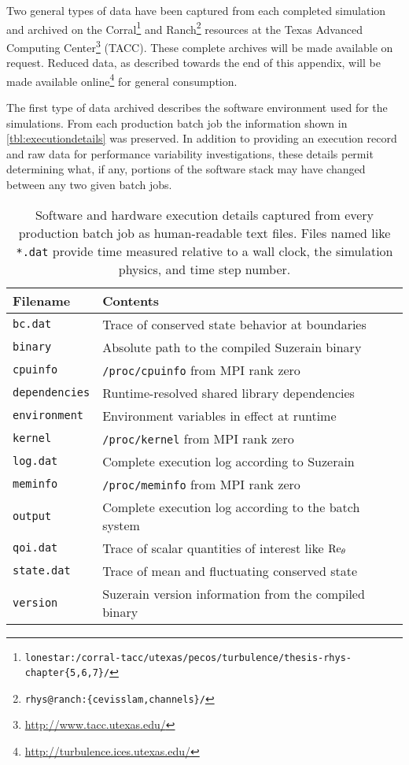 \label{sec:archiving}

Two general types of data have been captured from each completed
simulation and archived on the Corral\footnote{%
    \texttt{lonestar:/corral-tacc/utexas/pecos/turbulence/thesis-rhys-chapter\{5,6,7\}/}
}
and Ranch\footnote{%
    \texttt{rhys@ranch:\{cevisslam,channels\}/}
}
resources at the Texas Advanced Computing Center\footnote{%
    \url{http://www.tacc.utexas.edu/}
}
(TACC).  These complete archives will be made available on request.  Reduced
data, as described towards the end of this appendix, will be made available
online\footnote{\url{http://turbulence.ices.utexas.edu/}} for general
consumption.

The first type of data archived describes the software environment used for the
simulations.  From each production batch job the information shown in
\autoref{tbl:executiondetails} was preserved.
%
In addition to providing an execution record and raw data for performance
variability investigations, these details permit determining what, if any,
portions of the software stack may have changed between any two given batch
jobs.

\begin{table}
\centering
\caption[Execution details captured from each production batch job]{%
  Software and hardware execution details captured from every production batch
  job as human-readable text files.  Files named like \texttt{*.dat} provide time
  measured relative to a wall clock, the simulation physics, and time step
  number.\label{tbl:executiondetails}
}
\begin{small}
\begin{tabular}{p{}|p{}}
Filename & Contents \\ \hline \hline
\texttt{bc.dat}       & Trace of conserved state behavior at boundaries \\
\texttt{binary}       & Absolute path to the compiled Suzerain binary \\
\texttt{cpuinfo}      & \texttt{/proc/cpuinfo} from MPI rank zero \\
\texttt{dependencies} & Runtime-resolved shared library dependencies \\
\texttt{environment}  & Environment variables in effect at runtime \\
\texttt{kernel}       & \texttt{/proc/kernel} from MPI rank zero \\
\texttt{log.dat}      & Complete execution log according to Suzerain \\
\texttt{meminfo}      & \texttt{/proc/meminfo} from MPI rank zero \\
\texttt{output}       & Complete execution log according to the batch system \\
\texttt{qoi.dat}      & Trace of scalar quantities of interest like $\Reynolds[\theta]{}$ \\
\texttt{state.dat}    & Trace of mean and fluctuating conserved state \\
\texttt{version}      & Suzerain version information from the compiled binary
\end{tabular}
\end{small}
\end{table}

